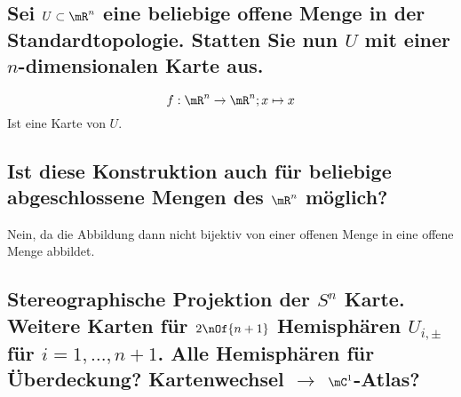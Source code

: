 \documentclass[11pt,a4paper]{scrartcl}
\begin{document}
	\subsection{Sei $U \subset \mR^n$ eine beliebige offene Menge in der Standardtopologie. Statten Sie nun $U$ mit einer $n$-dimensionalen Karte aus.}
	\begin{equation}
		f : \mR^n \to \mR^n; x \mapsto x
	\end{equation}
	Ist eine Karte von $U$.

	\subsection{Ist diese Konstruktion auch für beliebige abgeschlossene Mengen des $\mR^n$ möglich?}
	Nein, da die Abbildung dann nicht bijektiv von einer offenen Menge in eine offene Menge abbildet.

	\subsection{Stereographische Projektion der $S^n$ Karte. Weitere Karten für $2\nOf{n+1}$ Hemisphären $U_{i,\pm}$ für $i = 1,\dots,n+1$. Alle Hemisphären für Überdeckung? Kartenwechsel $\rightarrow$ $\mC^1$-Atlas?}
\end{document}
